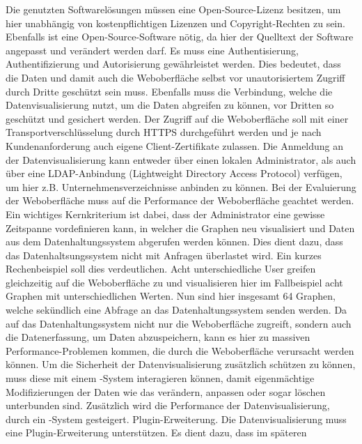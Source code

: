 \begin{outline}
  \1 Die genutzten Softwarelösungen müssen eine Open\hyp{}Source\hyp{}Lizenz
  besitzen, um hier unabhängig von kostenpflichtigen Lizenzen und
  Copyright\hyp{}Rechten zu sein.  Ebenfalls ist eine
  Open\hyp{}Source\hyp{}Software nötig, da hier der Quelltext der Software
  angepasst und verändert werden darf.
  \1 Es muss eine Authentisierung, Authentifizierung und Autorisierung
  gewährleistet werden. Dies bedeutet, dass die Daten und damit auch die
  Weboberfläche selbst vor unautorisiertem Zugriff durch Dritte geschützt sein
  muss. Ebenfalls muss die Verbindung, welche die Datenvisualisierung nutzt, um
  die Daten abgreifen zu können, vor Dritten so geschützt und gesichert werden.
  Der Zugriff auf die Weboberfläche soll mit einer Transportverschlüsselung
  durch \gls{HTTPS} durchgeführt werden und je nach Kundenanforderung auch
  eigene Client\hyp{}Zertifikate zulassen. Die Anmeldung an der
  Datenvisualisierung kann entweder über einen lokalen Administrator, als auch
  über eine LDAP\hyp{}Anbindung (Lightweight Directory Access Protocol)
  verfügen, um hier z.B.  Unternehmensverzeichnisse anbinden zu können.
  \1 Bei der Evaluierung der Weboberfläche muss auf die Performance der
  Weboberfläche geachtet werden. Ein wichtiges Kernkriterium ist dabei, dass
  der Administrator eine gewisse Zeitspanne vordefinieren kann, in welcher die
  Graphen neu visualisiert und Daten aus dem Datenhaltungssystem abgerufen
  werden können. Dies dient dazu, dass das Datenhaltsungssystem nicht mit
  Anfragen überlastet wird. Ein kurzes Rechenbeispiel soll dies verdeutlichen.
  Acht unterschiedliche User greifen gleichzeitig auf die Weboberfläche zu und
  visualisieren hier im Fallbeispiel acht Graphen mit unterschiedlichen
  Werten. Nun sind hier insgesamt 64 Graphen, welche sekündlich eine Abfrage an
  das Datenhaltungssystem senden werden. Da auf das Datenhaltungssystem nicht
  nur die Weboberfläche zugreift, sondern auch die Datenerfassung, um Daten
  abzuspeichern, kann es hier zu massiven Performance\hyp{}Problemen kommen,
  die durch die Weboberfläche verursacht werden können.
  \1 Um die Sicherheit der Datenvisualisierung zusätzlich schützen zu können,
  muss diese mit einem \hyp{}System interagieren können, damit
  eigenmächtige Modifizierungen der Daten wie das verändern, anpassen oder
  sogar löschen unterbunden sind. Zusätzlich wird die Performance der
  Datenvisualisierung, durch ein \hyp{}System gesteigert.
  \1 Plugin\hyp{}Erweiterung. Die Datenvisualisierung muss eine
  Plugin\hyp{}Erweiterung unterstützen. Es dient dazu, dass im späteren

\end{outline}
